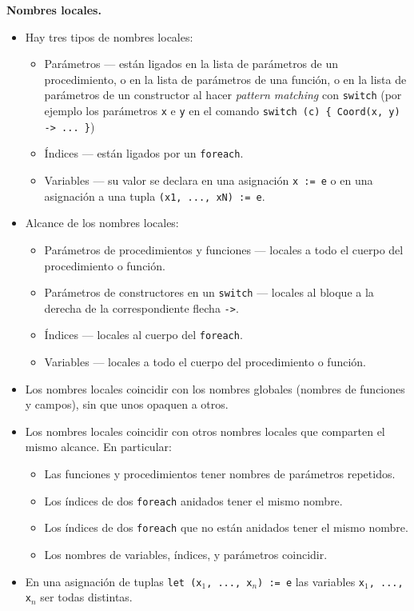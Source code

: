 \documentclass{article}
\begin{document}
{\bf Nombres locales.}
\begin{itemize}
\item Hay tres tipos de nombres locales:
  \begin{itemize}
  \item Par\'ametros --- est\'an ligados en la lista de par\'ametros de
        un procedimiento, o en la lista de par\'ametros de una funci\'on, 
        o en la lista de par\'ametros de un constructor al hacer {\em pattern matching}
        con \texttt{switch} (por ejemplo los par\'ametros \texttt{x} e \texttt{y} en
        el comando \texttt{switch (c) \{ Coord(x, y) -> ... \}})
  \item \'Indices --- est\'an ligados por un \texttt{foreach}.
  \item Variables --- su valor se declara en una asignaci\'on \texttt{x := e} o en una asignaci\'on
        a una tupla \texttt{(x1, ..., xN) := e}.
  \end{itemize}
\item Alcance de los nombres locales:
  \begin{itemize}
  \item Par\'ametros de procedimientos y funciones --- locales a todo el cuerpo del procedimiento o funci\'on.
  \item Par\'ametros de constructores en un \texttt{switch} --- locales al bloque a la derecha de la correspondiente flecha \texttt{->}.
  \item \'Indices --- locales al cuerpo del \texttt{foreach}.
  \item Variables --- locales a todo el cuerpo del procedimiento o funci\'on.
  \end{itemize}
\item Los nombres locales \PUEDEN
      coincidir con los nombres globales (nombres de funciones y campos), sin
      que unos opaquen a otros.
\item Los nombres locales \NOPUEDEN coincidir con otros nombres locales que comparten el mismo alcance.
      En particular:
  \begin{itemize}
  \item Las funciones y procedimientos \NOPUEDEN tener nombres de par\'ametros repetidos.
  \item Los \'indices de dos \texttt{foreach} anidados \NOPUEDEN tener el mismo nombre.
  \item Los \'indices de dos \texttt{foreach} que no est\'an anidados \PUEDEN tener el mismo nombre.
  \item Los nombres de variables, \'indices, y par\'ametros \NOPUEDEN coincidir.
  \end{itemize}
\item En una asignaci\'on de tuplas \texttt{let (x$_1$, ..., x$_n$) := e}
      las variables \texttt{x$_1$, ..., x$_n$} \DEBEN ser todas distintas. 
\end{itemize}
\end{document}
